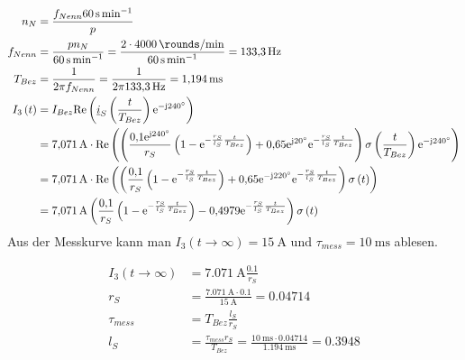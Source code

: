 \documentclass[11pt,a4paper]{scrartcl}
\newcommand{\mybr}[1]{\left(#1\right)}
\renewcommand{\j}{\mathrm{j}}
\renewcommand{\i}{\underline{i}}
\newcommand{\0}{_{\mybr{0}}}
\newcommand{\1}{_{\mybr{1}}}
\newcommand{\2}{_{\mybr{2}}}
\renewcommand{\e}{\mathrm{e}}
\renewcommand{\Re}{\mathrm{Re}}
\begin{document}
\section{}
\begin{align}
n_N&=\frac{f_{Nenn}\SI{60}{\second\per\minute}}{p}\\
f_{Nenn}&=\frac{p n_N}{\SI{60}{\second\per\minute}}=\frac{2\cdot\SI{4000}{\rounds\per\minute}}{\SI{60}{\second\per\minute}}=\SI{133.3}{\hertz}\\
T_{Bez}&=\frac{1}{2\pi f_{Nenn}}=\frac{1}{2\pi\SI{133.3}{\hertz}}=\SI{1.194}{\milli\second}\\
I_3\mybr{t}&=I_{Bez}\Re\mybr{\i_S\mybr{\frac{t}{T_{Bez}}}\e^{-\j\SI{240}{\degree}}}\\
&=\SI{7.071}{\ampere}\cdot\Re\mybr{\mybr{\frac{\num{0.1}\e^{\j\SI{240}{\degree}}}{r_S}\mybr{1-\e^{-\frac{r_S}{l_S}\frac{t}{T_{Bez}}}}+\num{0.65}\e^{\j\SI{20}{\degree}}\e^{-\frac{r_S}{l_S}\frac{t}{T_{Bez}}}}\sigma\mybr{\frac{t}{T_{Bez}}}\e^{-\j\SI{240}{\degree}}}\\
&=\SI{7.071}{\ampere}\cdot\Re\mybr{\mybr{\frac{\num{0.1}}{r_S}\mybr{1-\e^{-\frac{r_S}{l_S}\frac{t}{T_{Bez}}}}+\num{0.65}\e^{-\j\SI{220}{\degree}}\e^{-\frac{r_S}{l_S}\frac{t}{T_{Bez}}}}\sigma\mybr{t}}\\
&=\SI{7.071}{\ampere}\mybr{\frac{\num{0.1}}{r_S}\mybr{1-\e^{-\frac{r_S}{l_S}\frac{t}{T_{Bez}}}}-\num{0.4979}\e^{-\frac{r_S}{l_S}\frac{t}{T_{Bez}}}}\sigma\mybr{t}\\
\end{align}
Aus der Messkurve kann man $I_3\mybr{t\rightarrow\infty}=\SI{15}{\ampere}$ und $\tau_{mess}=\SI{10}{\milli\second}$ ablesen.
\begin{figure*}[!hp]
	\centering
\end{figure*}
\begin{align}
I_3\mybr{t\rightarrow\infty}&=\SI{7.071}{\ampere}\frac{\num{0.1}}{r_S}\\
r_S&=\frac{\SI{7.071}{\ampere}\cdot\num{0.1}}{\SI{15}{\ampere}}=\num{0.04714}\\
\tau_{mess}&=T_{Bez}\frac{l_S}{r_S}\\
l_S&=\frac{\tau_{mess}r_S}{T_{Bez}}=\frac{\SI{10}{\milli\second}\cdot\num{0.04714}}{\SI{1.194}{\milli\second}}=\num{0.3948}
\end{align}
\end{document}
